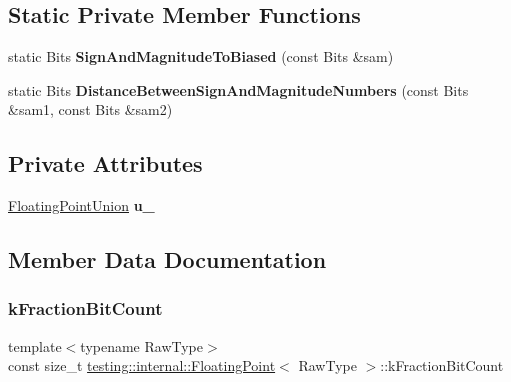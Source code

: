\subsection*{Static Private Member Functions}
\begin{DoxyCompactItemize}
\item 
\mbox{\label{classtesting_1_1internal_1_1_floating_point_a2cf0e39c6ebf026bc0353100d031ca85}} 
static Bits {\bfseries Sign\+And\+Magnitude\+To\+Biased} (const Bits \&sam)
\item 
\mbox{\label{classtesting_1_1internal_1_1_floating_point_afe00f9f26ad2929a061f7e07b8a5071a}} 
static Bits {\bfseries Distance\+Between\+Sign\+And\+Magnitude\+Numbers} (const Bits \&sam1, const Bits \&sam2)
\end{DoxyCompactItemize}
\subsection*{Private Attributes}
\begin{DoxyCompactItemize}
\item 
\mbox{\label{classtesting_1_1internal_1_1_floating_point_a2e0b6bd427248b91476f3fca281f7104}} 
\hyperlink{uniontesting_1_1internal_1_1_floating_point_1_1_floating_point_union}{Floating\+Point\+Union} {\bfseries u\+\_\+}
\end{DoxyCompactItemize}


\subsection{Member Data Documentation}
\mbox{\label{classtesting_1_1internal_1_1_floating_point_a0b756a6d2a4f5f5b41ca79651c06c043}} 
\subsubsection{\texorpdfstring{k\+Fraction\+Bit\+Count}{kFractionBitCount}}
{\footnotesize\ttfamily template$<$typename Raw\+Type$>$ \\
const size\+\_\+t \hyperlink{classtesting_1_1internal_1_1_floating_point}{testing\+::internal\+::\+Floating\+Point}$<$ Raw\+Type $>$\+::k\+Fraction\+Bit\+Count\hspace{0.3cm}{\ttfamily [static]}}

